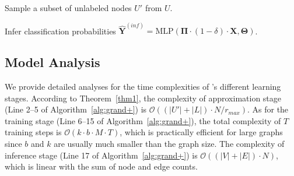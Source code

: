 \begin{algorithm}[t!]

	\caption{\model}
	\footnotesize
	\label{alg:grand+}
	 Sample a subset of unlabeled nodes $U'$ from $U$.\\



	  



		Infer classification probabilities $\hat{\mathbf{Y}}^{(inf)} =  \text{MLP}( \mathbf{\Pi}\cdot (1-\delta) \cdot \mathbf{X}, \mathbf{\Theta})$.
		
\end{algorithm}
\subsection{Model Analysis} 
\label{sec:model_analysis}

  We provide detailed analyses for the time complexities of \model's different learning stages.
 According to Theorem~\ref{thm1}, the complexity of approximation stage (Line 2--5 of Algorithm~\ref{alg:grand+}) is $\mathcal{O}((|U'|+|L|)\cdot N/r_{max})$. As for the training stage (Line 6--15 of Algorithm~\ref{alg:grand+}), the total complexity of $T$ training steps is $\mathcal{O}(k\cdot b \cdot M \cdot T)$, which is  practically efficient for large graphs since $b$ and $k$ are usually much smaller than the graph size.
  The complexity of inference stage (Line 17 of Algorithm~\ref{alg:grand+}) is $\mathcal{O}((|V|+|E|) \cdot N)$, which is linear with the sum of node and edge counts.
 
